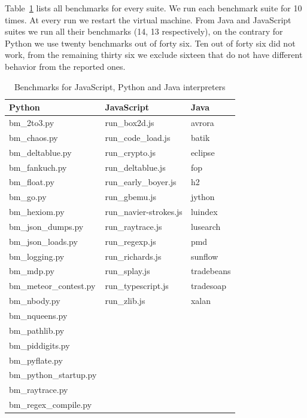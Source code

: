 \documentclass[parskip=full, paper=a4, fontsize=12pt]{scrartcl}
\numberwithin{equation}{section}
\numberwithin{figure}{section}
\numberwithin{table}{section}
\begin{document}
Table~\ref{tab:benchmarks} lists all benchmarks for every suite. We
run each benchmark suite for 10 times. At every run we restart the
virtual machine. From Java and JavaScript suites we run all their
benchmarks (14, 13 respectively), on the contrary for Python we use
twenty benchmarks out of forty six. Ten out of forty six did not work,
from the remaining thirty six we exclude sixteen that do not have
different behavior from the reported ones.

\begin{table}
\centering
    \begin{tabular}{|l|l|l|}
        \hline
        \textbf{Python}         &\textbf{JavaScript}        &\textbf{Java} \\
        \hline
        bm\_2to3.py             &run\_box2d.js              &avrora     \\
        bm\_chaos.py            &run\_code\_load.js         &batik      \\
        bm\_deltablue.py        &run\_crypto.js             &eclipse    \\
        bm\_fankuch.py          &run\_deltablue.js          &fop        \\
        bm\_float.py            &run\_early\_boyer.js       &h2         \\
        bm\_go.py               &run\_gbemu.js              &jython     \\
        bm\_hexiom.py           &run\_navier-strokes.js     &luindex    \\
        bm\_json\_dumps.py      &run\_raytrace.js           &lusearch   \\
        bm\_json\_loads.py      &run\_regexp.js             &pmd        \\
        bm\_logging.py          &run\_richards.js           &sunflow    \\
        bm\_mdp.py              &run\_splay.js              &tradebeans \\
        bm\_meteor\_contest.py  &run\_typescript.js         &tradesoap  \\
        bm\_nbody.py            &run\_zlib.js               &xalan      \\
        bm\_nqueens.py          &                           &           \\
        bm\_pathlib.py          &                           &           \\
        bm\_piddigits.py        &                           &           \\
        bm\_pyflate.py          &                           &           \\
        bm\_python\_startup.py  &                           &           \\
        bm\_raytrace.py         &                           &           \\
        bm\_regex\_compile.py   &                           &           \\
        \hline
    \end{tabular}
    \caption{Benchmarks for JavaScript, Python and Java interpreters}
    \label{tab:benchmarks}
\end{table}
\end{document}
